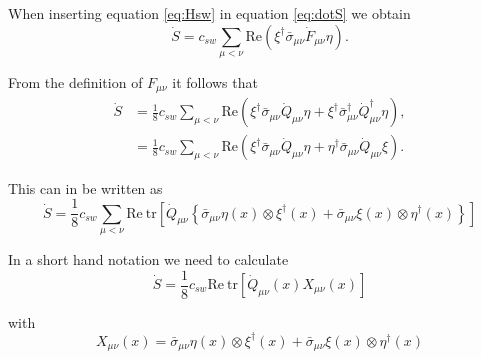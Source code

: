 \documentclass[12pt]{article}
\newcommand{\tr}{\mathrm{tr}}
\newcommand{\re}{\mathrm{Re}}
\begin{document}
When inserting equation \eqref{eq:Hsw} in equation \eqref{eq:dotS} we obtain
\begin{equation}
 \dot{S} = c_{sw}\sum_{\mu<\nu}\re(\xi^\dagger\bar{\sigma}_{\mu\nu}\dot{F}_{\mu\nu}\eta).
\end{equation}

From the definition of $F_{\mu\nu}$ it follows that
\begin{align}
 \dot{S} &= \frac{1}{8}c_{sw}\sum_{\mu<\nu}\re(\xi^\dagger\bar{\sigma}_{\mu\nu}\dot{Q}_{\mu\nu}\eta + \xi^\dagger\bar{\sigma}_{\mu\nu}^\dagger\dot{Q}_{\mu\nu}^\dagger\eta), \\
 &=
 \frac{1}{8}c_{sw}\sum_{\mu<\nu}\re(\xi^\dagger\bar{\sigma}_{\mu\nu}\dot{Q}_{\mu\nu}\eta + \eta^\dagger\bar{\sigma}_{\mu\nu}\dot{Q}_{\mu\nu}\xi).
\end{align}

This can in be written as
\begin{equation}
 \dot{S} = \frac{1}{8}c_{sw}\sum_{\mu<\nu} \re~\tr\left[\dot{Q}_{\mu\nu}\left\{\bar{\sigma}_{\mu\nu}\eta(x)\otimes\xi^\dagger(x) + \bar{\sigma}_{\mu\nu}\xi(x)\otimes\eta^\dagger(x)\right\}\right]
\end{equation}

In a short hand notation we need to calculate
\begin{equation}
 \dot{S} = \frac{1}{8}c_{sw}\re~\tr[\dot{Q}_{\mu\nu}(x)X_{\mu\nu}(x)]
 \label{eq:force}
\end{equation}

with
\begin{equation}
 X_{\mu\nu}(x) = \bar{\sigma}_{\mu\nu}\eta(x)\otimes\xi^\dagger(x) + \bar{\sigma}_{\mu\nu}\xi(x)\otimes\eta^\dagger(x)
\end{equation}
\end{document}
